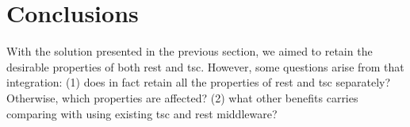 \section{Conclusions} %

With the solution presented in the previous section, we aimed to retain the desirable properties of both \ac{rest} and \ac{tsc}.
However, some questions arise from that integration:
(1) does in fact retain all the properties of \ac{rest} and \ac{tsc} separately? Otherwise, which properties are affected?
(2) what other benefits carries comparing with using existing \ac{tsc} and \ac{rest} middleware?



